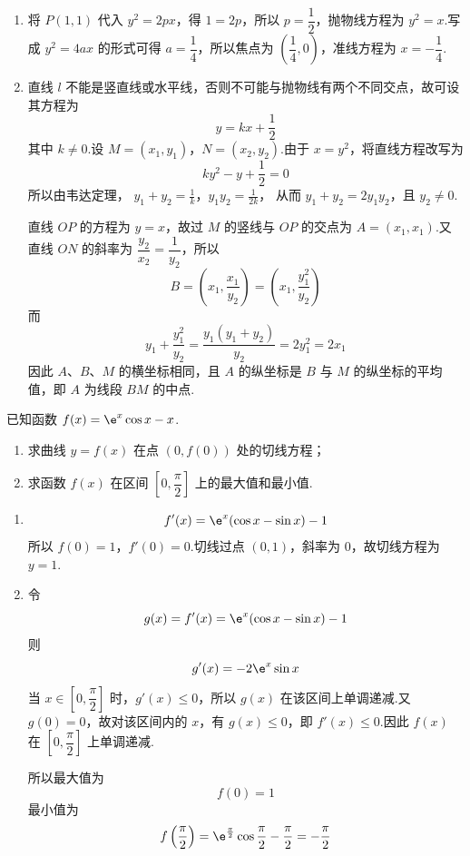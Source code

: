 \begin{solution}
\begin{enumerate}
\item 将 \(P(1,1)\) 代入 \(y^2=2px\)，得 \(1=2p\)，所以 \(p=\dfrac12\)，抛物线方程为 \(y^2=x\).写成 \(y^2=4ax\) 的形式可得 \(a=\dfrac14\)，所以焦点为 \(\left(\dfrac14,0\right)\)，准线方程为 \(x=-\dfrac14\).

\item 直线 \(l\) 不能是竖直线或水平线，否则不可能与抛物线有两个不同交点，故可设其方程为
\[
y=kx+\frac12
\]
其中 \(k\ne0\).设 \(M=(x_1,y_1)\)，\(N=(x_2,y_2)\).由于 \(x=y^2\)，将直线方程改写为
\[
k y^2-y+\frac12=0
\]
所以由韦达定理，
\(y_1+y_2=\frac1k\)，\(y_1y_2=\frac1{2k}\)，
从而 \(y_1+y_2=2y_1y_2\)，且 \(y_2\ne0\).

直线 \(OP\) 的方程为 \(y=x\)，故过 \(M\) 的竖线与 \(OP\) 的交点为 \(A=(x_1,x_1)\).又直线 \(ON\) 的斜率为 \(\dfrac{y_2}{x_2}=\dfrac1{y_2}\)，所以
\[
B=\left(x_1,\frac{x_1}{y_2}\right)=\left(x_1,\frac{y_1^2}{y_2}\right)
\]
而
\[
y_1+\frac{y_1^2}{y_2}=\frac{y_1(y_1+y_2)}{y_2}=2y_1^2=2x_1
\]
因此 \(A\)、\(B\)、\(M\) 的横坐标相同，且 \(A\) 的纵坐标是 \(B\) 与 \(M\) 的纵坐标的平均值，即 \(A\) 为线段 \(BM\) 的中点.
\end{enumerate}
\end{solution}

\begin{problem}
已知函数 \(f(x)=\e^x\cos x-x\).

\begin{enumerate}
\item 求曲线 \(y=f(x)\) 在点 \((0,f(0))\) 处的切线方程；
\item 求函数 \(f(x)\) 在区间 \(\left[0,\dfrac{\pi}{2}\right]\) 上的最大值和最小值.
\end{enumerate}
\end{problem}

\begin{solution}
\begin{enumerate}
\item
\[
f'(x)=\e^x(\cos x-\sin x)-1
\]
所以 \(f(0)=1\)，\(f'(0)=0\).切线过点 \((0,1)\)，斜率为 \(0\)，故切线方程为 \(y=1\).

\item 令
\[
g(x)=f'(x)=\e^x(\cos x-\sin x)-1
\]
则
\[
g'(x)=-2\e^x\sin x
\]
当 \(x\in\left[0,\dfrac{\pi}{2}\right]\) 时，\(g'(x)\le0\)，所以 \(g(x)\) 在该区间上单调递减.又 \(g(0)=0\)，故对该区间内的 \(x\)，有 \(g(x)\le0\)，即 \(f'(x)\le0\).因此 \(f(x)\) 在 \(\left[0,\dfrac{\pi}{2}\right]\) 上单调递减.

所以最大值为
\[
f(0)=1
\]
最小值为
\[
f\left(\frac\pi2\right)=\e^{\frac\pi2}\cos\frac\pi2-\frac\pi2=-\frac\pi2
\]
\end{enumerate}
\end{solution}

